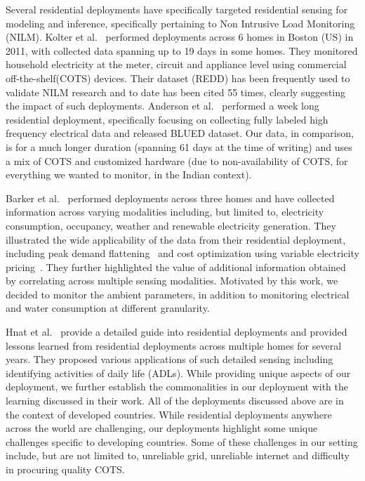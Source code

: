 \documentclass[10pt]{sensys-proc}
\begin{document}
Several residential deployments have specifically targeted residential sensing for modeling and inference, specifically pertaining to Non Intrusive Load Monitoring (NILM). Kolter et al.~\cite{redd} performed deployments across 6 homes in Boston (US) in 2011, with collected data spanning up to 19 days in some homes. They monitored household electricity at the meter, circuit and appliance level using commercial off-the-shelf(COTS) devices. Their dataset (REDD) has been frequently used to validate NILM research and to date has been cited 55 times, clearly suggesting the impact of such deployments. Anderson et al.~\cite{blued_cmu} performed a week long residential deployment, specifically focusing on collecting fully labeled high frequency electrical data and released BLUED dataset. Our data, in comparison, is for a much longer duration (spanning 61 days at the time of writing) and uses a mix of COTS and customized hardware (due to non-availability of COTS, for everything we wanted to monitor, in the Indian context).

Barker et al.~\cite{smart} performed deployments across three homes and have collected information across varying modalities including, but limited to, electricity consumption, occupancy, weather and renewable electricity generation. They illustrated the wide applicability of the data from their residential deployment, including peak demand flattening~\cite{smartcap} and cost optimization using variable electricity pricing~\cite{smartcharge}. They further highlighted the value of additional information obtained by correlating across multiple sensing modalities. Motivated by this work, we decided to monitor the ambient parameters, in addition to monitoring electrical and water consumption at different granularity.

Hnat et al.~\cite{hitchhiker_residential} provide a detailed guide into residential deployments and provided lessons learned from residential deployments across multiple homes for several years. They proposed various applications of such detailed sensing including identifying activities of daily life (ADLs). While providing unique aspects of our deployment, we further establish the commonalities in our deployment with the learning discussed in their work. %
All of the deployments discussed above are in the context of developed countries. While residential deployments anywhere across the world are challenging, our deployments highlight some unique challenges specific to developing countries. Some of these challenges in our setting include, but are not limited to, unreliable grid, unreliable internet and difficulty in procuring quality COTS.
\end{document}
